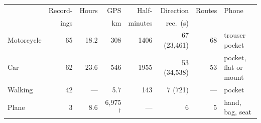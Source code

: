 \begin{tabular}{lrrrrrrl}
\toprule
 & Record- & Hours & GPS & Half- & Direction & Routes & Phone\\
 & ings & & km & minutes & rec.\ (s) & & \\
\midrule
Motorcycle & 65 & 18.2 & 308 & 1406 & 67 (23{,}461) & 68 & trouser pocket \\
Car & 62 & 23.6 & 546 & 1955 & 53 (34{,}538) & 53 & pocket, flat or mount \\
Walking & 42 & --- & 5.7 & 143 & 7 (721) & --- & pocket \\
Plane & 3 & 8.6 & 6{,}975$^\dagger$ & --- & 6 & 5 & hand, bag, seat \\
\bottomrule
\end{tabular}
